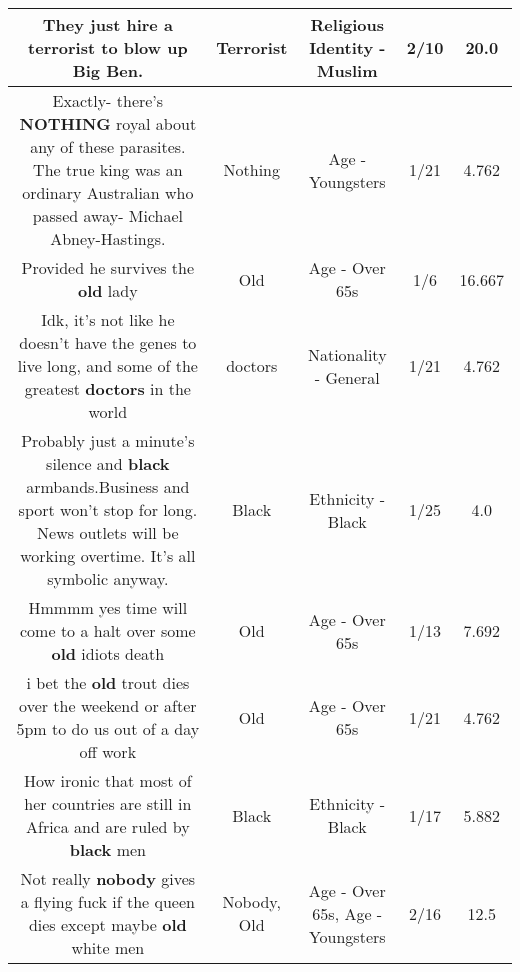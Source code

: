 \documentclass[11pt]{article}
\newlength\mylength
\begin{document}
\begin{center}
\begin{longtable}{|C{.65\mylength}|C{.30\mylength}|C{.12\mylength}|C{.12\mylength}|C{.12\mylength}|}
  \small They just hire a \textbf{terrorist} to blow up Big Ben.\normalsize   & Terrorist & Religious Identity - Muslim & 2/10 & 20.0 \\  \hline
  \small Exactly- there's \textbf{NOTHING} royal about any of these parasites. The true king was an ordinary Australian who passed away- Michael Abney-Hastings.\normalsize   & Nothing & Age - Youngsters & 1/21 & 4.762 \\  \hline
  \small Provided he survives the \textbf{old} lady\normalsize   & Old & Age - Over 65s & 1/6 & 16.667 \\  \hline
  \small Idk, it's not like he doesn't have the genes to live long, and some of the greatest \textbf{doctors} in the world\normalsize   & doctors & Nationality - General & 1/21 & 4.762 \\  \hline
  \small Probably just a minute's silence and \textbf{black} armbands.Business and sport won't stop for long. News outlets will be working overtime. It's all symbolic anyway.\normalsize   & Black & Ethnicity - Black & 1/25 & 4.0 \\  \hline
  \small Hmmmm yes time will come to a halt over some \textbf{old} idiots death\normalsize   & Old & Age - Over 65s & 1/13 & 7.692 \\  \hline
  \small i bet the \textbf{old} trout dies over the weekend or after 5pm to do us out of a day off work\normalsize   & Old & Age - Over 65s & 1/21 & 4.762 \\  \hline
  \small How ironic that most of her countries are still in Africa and are ruled by \textbf{black} men\normalsize   & Black & Ethnicity - Black & 1/17 & 5.882 \\  \hline
  \small Not really \textbf{nobody} gives a flying fuck if the queen dies except maybe \textbf{old} white men\normalsize   & Nobody, Old & Age - Over 65s, Age - Youngsters & 2/16 & 12.5 \\  \hline

\end{longtable}
\end{center}
\end{document}

